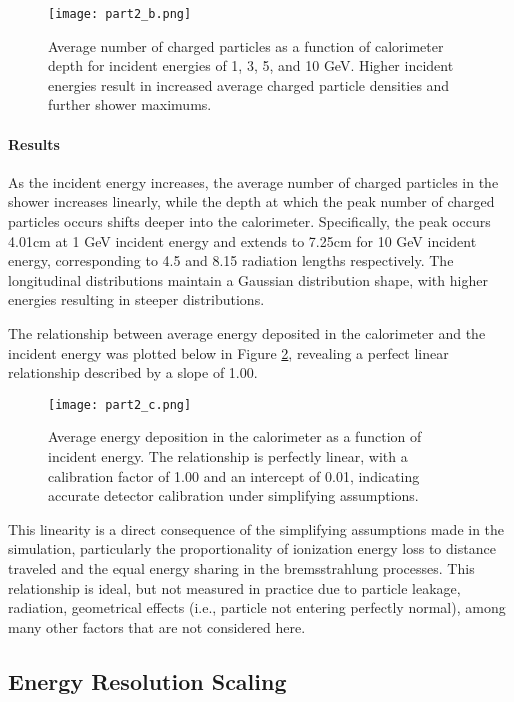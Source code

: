 \documentclass[twocolumn]{aastex631}
\begin{document}
\begin{figure}[htp]
  \centering
    \texttt{[image: part2\_b.png]}
    \caption{Average number of charged particles as a function of calorimeter
        depth for incident energies of 1, 3, 5, and 10 GeV. Higher incident energies result in
        increased average charged particle densities and further shower
    maximums.}
    \label{fig:2b}
\end{figure}

\paragraph{Results} As the incident energy increases, the average number of
charged particles in the shower increases linearly, while the depth at which
the peak number of charged particles occurs shifts deeper into the
calorimeter. Specifically, the peak occurs 4.01cm at 1 GeV incident energy and
extends to 7.25cm for 10 GeV incident energy, corresponding to 4.5 and 8.15
radiation lengths respectively. The longitudinal distributions maintain a
Gaussian distribution shape, with higher energies resulting in steeper
distributions. 

The relationship between average energy deposited in the calorimeter and the
incident energy was plotted below in Figure \ref{fig:2c}, revealing a perfect linear relationship described
by a slope of 1.00. 


\begin{figure}[htp]
  \centering
    \texttt{[image: part2\_c.png]}
    \caption{Average energy deposition in the calorimeter as a function of incident
        energy. The relationship is perfectly linear, with a calibration factor
        of 1.00 and an intercept of 0.01, indicating accurate detector
    calibration under simplifying assumptions.}
    \label{fig:2c}
\end{figure}

This linearity is a direct consequence of the simplifying assumptions made in
the simulation, particularly the proportionality of ionization energy loss to
distance traveled and the equal energy sharing in the bremsstrahlung processes.
This relationship is ideal, but not measured in practice due to particle
leakage, radiation, geometrical effects (i.e., particle not entering perfectly
normal), among many other factors that are not considered here. 
 
\subsection{Energy Resolution Scaling} 
\end{document}
